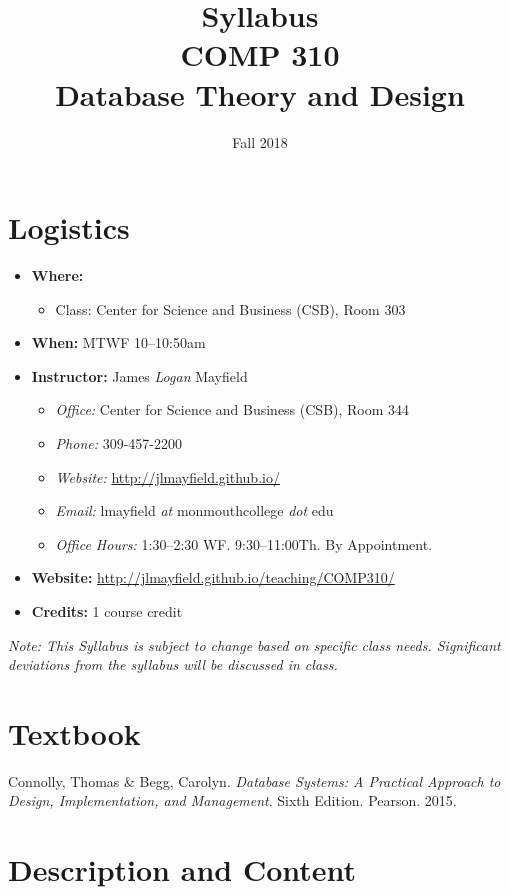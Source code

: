 \documentclass[10pt]{article}
\title{Syllabus \\ COMP 310 \\ Database Theory and Design}
\author{  }
\date{Fall 2018}
\begin{document}
\maketitle

\section{Logistics}
\begin{itemize}
\item \textbf{Where: }
\begin{itemize}
\item Class: Center for Science and Business (CSB), Room 303
\end{itemize}
\item \textbf{When: } MTWF 10--10:50am
\item \textbf{Instructor: } James \textit{Logan} Mayfield
\begin{itemize}
\item \textit{Office: } Center for Science and Business (CSB), Room 344
\item \textit{Phone: } 309-457-2200 %
\item \textit{Website: } \url{http://jlmayfield.github.io/}
\item \textit{Email: } lmayfield \textit{at} monmouthcollege \textit{dot} edu
\item \textit{Office Hours: }  1:30--2:30 WF. 9:30--11:00Th. By Appointment.
\end{itemize}
\item \textbf{Website: } \url{http://jlmayfield.github.io/teaching/COMP310/}
\item \textbf{Credits: } 1 course credit
\end{itemize}
\emph{Note: This Syllabus is subject to change based on specific class needs. Significant deviations from the syllabus will be discussed in class.}

\section{Textbook}

\noindent
Connolly, Thomas \& Begg, Carolyn. \textit{Database Systems: A Practical Approach to Design, Implementation, and Management}. Sixth Edition. Pearson. 2015. %

\section{Description and Content}
\end{document}
